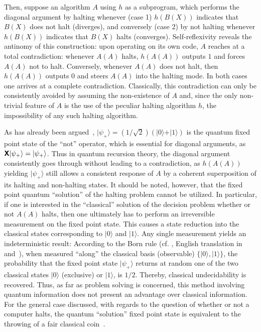 \documentclass{llncs}
\begin{document}
Then, suppose an algorithm $A$ using $ h $ as a subprogram,
which performs the diagonal argument
by halting whenever (case 1) $ h (B(X))$ indicates that $B(X)$ does not halt (diverges),
and conversely (case 2)
by not halting whenever $ h (B(X))$ indicates that $B(X)$ halts (converges).
Self-reflexivity reveals the antinomy of this construction:
upon operating on its own code, $A$ reaches at a total contradiction:
whenever  $A(A)$
halts, $ h (A(A))$ outputs $1$ and forces $A(A)$ not to halt.
Conversely,
whenever $A(A)$ does not halt, then $ h (A(A))$ outputs $0$
and steers
$A(A)$ into the halting mode.  In both cases one arrives at a complete
contradiction.  Classically, this contradiction can only be consistently
avoided by assuming the non-existence of $A$ and, since the only
non-trivial feature of $A$ is the use of the peculiar halting algorithm
$ h $, the impossibility of any such halting algorithm.

As has already been argued~\cite{maryland,quantum-omega,svo-1995-paradox,sv-aut-rev},
$\vert \psi_+ \rangle = ({1}/{\sqrt{2}})\left( \vert 0\rangle + \vert 1\rangle   \right)$
is the quantum fixed point state of the ``not'' operator,
which is essential for diagonal arguments, as
$
\textsf{\textbf{X}}\vert \psi_+ \rangle = \vert \psi_+ \rangle
$.
Thus in quantum recursion theory,
the diagonal argument consistently goes through without leading to a contradiction,
as $ h (A(A))$ yielding $\vert \psi_+ \rangle$ still allows a consistent response
of $A$ by a coherent superposition of its halting and non-halting states.
It should be noted, however, that the fixed point quantum ``solution''
of the  halting problem cannot be utilized.
In particular, if one is interested in the ``classical'' solution of the decision problem whether
or not $A(A)$ halts,  then one ultimately has to perform an
irreversible measurement
on the fixed point state. This  causes a state reduction into the
classical states corresponding to $\vert 0\rangle$ and $\vert 1\rangle$.
Any single measurement  yields an indeterministic result:
According to the Born rule
(cf. \cite[p.~804]{born-26-2}, English translation in \cite[p.~302]{jammer:89} and~\cite{zeil-05_nature_ofQuantum}),
when measured ``along'' the classical basis (observable) $\{\vert 0\rangle,\vert 1\rangle \}$,
the probability that the fixed point state $\vert \psi_+ \rangle$  returns at random
one of the two classical states $\vert 0\rangle$ (exclusive) or $\vert 1\rangle$, is $1/2$.
Thereby, classical undecidability is recovered.
Thus, as far as problem solving is concerned, this method involving quantum information does not present an advantage
over classical information.  For the general case discussed, with regards to the question of
whether or not a computer halts, the quantum ``solution'' fixed point state
is equivalent to the throwing of a fair classical coin~\cite{diaconis:211}.
\end{document}

